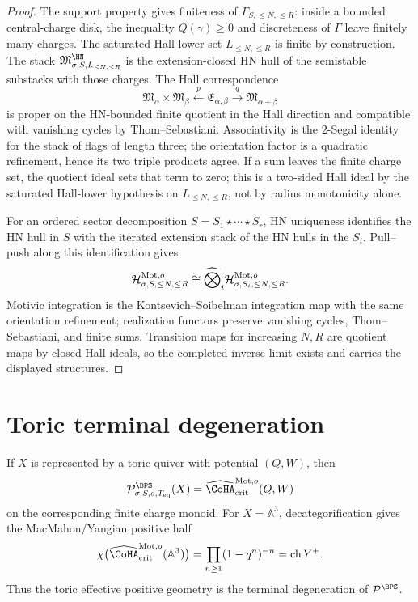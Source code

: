 \begin{proof}
The support property gives finiteness of \(\Gamma_{S,\leq N,\leq R}\):
inside a bounded central-charge disk, the inequality \(Q(\gamma)\geq0\)
and discreteness of \(\Gamma\) leave finitely many charges. The
saturated Hall-lower set \(L_{\leq N,\leq R}\) is finite by construction.
The stack
\(\mathfrak M^{\HN}_{\sigma,S,L_{\leq N,\leq R}}\) is the
extension-closed HN hull of the semistable substacks with those charges.
The Hall correspondence
\[
\mathfrak M_{\alpha}\times\mathfrak M_{\beta}
\xleftarrow{\,p\,}
\mathfrak E_{\alpha,\beta}
\xrightarrow{\,q\,}
\mathfrak M_{\alpha+\beta}
\]
is proper on the HN-bounded finite quotient in the Hall direction and
compatible with vanishing cycles by Thom--Sebastiani. Associativity is
the \(2\)-Segal identity for the stack of flags of length three; the
orientation factor is a quadratic refinement, hence its two triple
products agree. If a sum leaves the finite charge set, the quotient
ideal sets that term to zero; this is a two-sided Hall ideal by the
saturated Hall-lower hypothesis on \(L_{\leq N,\leq R}\), not by
radius monotonicity alone.

For an ordered sector decomposition \(S=S_1\star\cdots\star S_r\),
HN uniqueness identifies the HN hull in \(S\) with the iterated
extension stack of the HN hulls in the \(S_i\). Pull--push along this
identification gives
\[
\mathcal H^{\mathrm{Mot},o}_{\sigma,S,\leq N,\leq R}
\cong
\widehat\bigotimes_i
\mathcal H^{\mathrm{Mot},o}_{\sigma,S_i,\leq N,\leq R}.
\]
Motivic integration is the Kontsevich--Soibelman integration map with
the same orientation refinement; realization functors preserve
vanishing cycles, Thom--Sebastiani, and finite sums. Transition maps
for increasing \(N,R\) are quotient maps by closed Hall ideals, so the
completed inverse limit exists and carries the displayed structures.
\end{proof}

\section{Toric terminal degeneration}

\begin{theorem}
\label{thm:bps-positive-toric-terminal}
If \(X\) is represented by a toric quiver with potential \((Q,W)\), then
\[
\mathcal P^{\BPS}_{\sigma,S,o,T_{\mathrm{eq}}}(X)
=
\widehat{\CoHA}^{\Mot,o}_{\mathrm{crit}}(Q,W)
\]
on the corresponding finite charge monoid. For \(X=\mathbb A^3\),
decategorification gives the MacMahon/Yangian positive half
\[
\chi\bigl(\widehat{\CoHA}^{\Mot,o}_{\mathrm{crit}}(\mathbb A^3)\bigr)
=
\prod_{n\geq1}(1-q^n)^{-n}
=
\operatorname{ch}Y^+.
\]
Thus the toric effective positive geometry is the terminal degeneration
of \(\mathcal P^{\BPS}\).
\end{theorem}

